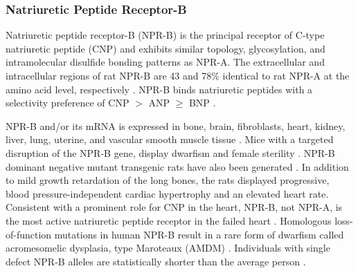\documentclass[14pt,a4paper,onecolumn]{extarticle}
\begin{document}
\subsubsection{Natriuretic Peptide Receptor-B}
Natriuretic peptide receptor-B (NPR-B) is the principal receptor of C-type natriuretic peptide (CNP) and exhibits similar topology, glycosylation, and intramolecular disulfide bonding patterns as NPR-A. The extracellular and intracellular regions of rat NPR-B are 43 and 78\% identical to rat NPR-A at the amino acid level, respectively \citep{Schulz1989}. NPR-B binds natriuretic peptides with a selectivity preference of CNP $>$ ANP $\ge$ BNP \citep{Bennett1991} \citep{Koller1991} \citep{Suga1992a}. %

NPR-B and/or its mRNA is expressed in bone, brain, fibroblasts, heart, kidney, liver, lung, uterine, and vascular smooth muscle tissue \citep{Bryan2006} \citep{Chrisman1993} \citep{Dickey2007} \citep{Herman1996} \citep{Langub1995}. Mice with a targeted disruption of the NPR-B gene, display dwarfism and  female sterility \citep{Tamura2004}.
NPR-B dominant negative mutant transgenic rats have also been generated \citep{Langenickel2006}. In addition to mild growth retardation of the long bones, the rats displayed progressive, blood pressure-independent cardiac hypertrophy and an elevated heart rate. Consistent with a prominent role for CNP in the heart, NPR-B, not NPR-A, is the most active natriuretic peptide receptor in the failed heart \citep{Dickey2007}. Homologous loss-of-function mutations in human NPR-B result in a rare form of dwarfism called acromesomelic dysplasia, type Maroteaux (AMDM) \citep{Bartels2004}. Individuals with single defect NPR-B alleles are statistically shorter than the average person \citep{Olney2006}.
\end{document}
